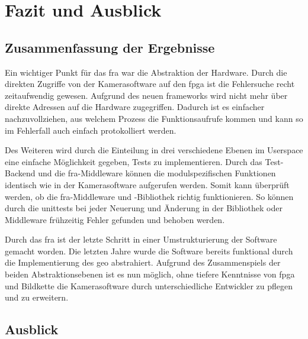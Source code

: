 \chapter{Fazit und Ausblick}


\section{Zusammenfassung der Ergebnisse}

Ein wichtiger Punkt für das \ac{fra} war die Abstraktion der Hardware. Durch die direkten Zugriffe von der Kamerasoftware auf den \ac{fpga} ist die Fehlersuche recht zeitaufwendig gewesen. Aufgrund des neuen \glspl{framework} wird nicht mehr über direkte Adressen auf die Hardware zugegriffen. Dadurch ist es einfacher nachzuvollziehen, aus welchem Prozess die Funktions\-aufrufe kommen und kann so im Fehlerfall auch einfach protokolliert werden.


Des Weiteren wird durch die Einteilung in drei verschiedene Ebenen im Userspace eine einfache Möglichkeit gegeben, Tests zu implementieren. Durch das Test-Backend und die \ac{fra}-Middleware können die modulspezifischen Funktionen identisch wie in der Kamerasoftware aufgerufen werden. Somit kann überprüft werden, ob die \ac{fra}-Middleware und -Bibliothek richtig funktionieren. So können durch die \glspl{unittest} bei jeder Neuerung und Änderung in der Bibliothek oder Middleware frühzeitig Fehler gefunden und behoben werden.


Durch das \ac{fra} ist der letzte Schritt in einer Umstrukturierung der Software gemacht worden. Die letzten Jahre wurde die Software bereits funktional durch die Implementierung des \ac{geo} abstrahiert. Aufgrund des Zusammenspiels der beiden Abstraktionsebenen ist es nun möglich, ohne tiefere Kenntnisse von \ac{fpga} und Bildkette die Kamerasoftware durch unterschiedliche Entwickler zu pflegen und zu erweitern.


\section{Ausblick}

